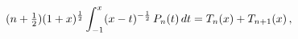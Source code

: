 \[(n+\tfrac{1}{2})(1+x)^{\frac{1}{2}}\int_{-1}^{x}(x-t)^{-\frac{1}{2}}\mathop{P_%
{n}\/}\nolimits\!\left(t\right)dt=\mathop{T_{n}\/}\nolimits\!\left(x\right)+%
\mathop{T_{n+1}\/}\nolimits\!\left(x\right),\]